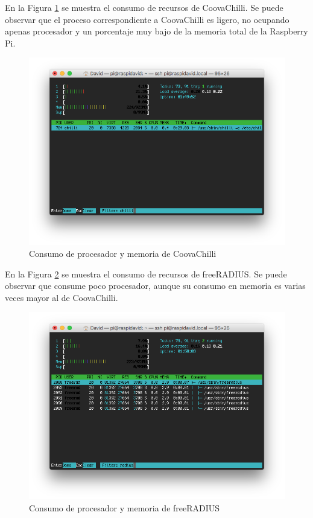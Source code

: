 En la Figura \ref{htopChilli} se muestra el consumo de recursos de CoovaChilli. Se puede observar que el proceso correspondiente a CoovaChilli es ligero, no ocupando apenas procesador y un porcentaje muy bajo de la memoria total de la Raspberry Pi.

\begin{figure}[!t]
\begin{center}
\includegraphics[width=0.75\linewidth]{./6_EvalEmpirica/Img/htopChilli.png}
\end{center}
\caption{Consumo de procesador y memoria de CoovaChilli}
\label{htopChilli}
\end{figure}

En la Figura \ref{htopRADIUS} se muestra el consumo de recursos de freeRADIUS. Se puede observar que consume poco procesador, aunque su consumo en memoria es varias veces mayor al de CoovaChilli.

\begin{figure}[!t]
\begin{center}
\includegraphics[width=0.75\linewidth]{./6_EvalEmpirica/Img/htopRADIUS.png}
\end{center}
\caption{Consumo de procesador y memoria de freeRADIUS}
\label{htopRADIUS}
\end{figure}

